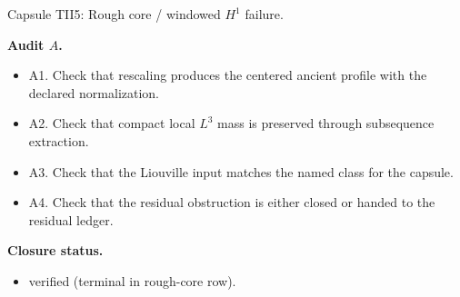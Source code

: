 \documentclass[11pt]{amsart}
\newcommand{\capsulefield}[1]{\par\smallskip\noindent\textbf{#1.}\ }
\begin{document}
\begin{proofcapsule}{Capsule TII5: Rough core / windowed $H^1$ failure.}
  \capsulefield{Audit \(A\)}
  \begin{itemize}[leftmargin=1.8em]
  \item A1. Check that rescaling produces the centered ancient profile with the declared normalization.
  \item A2. Check that compact local $L^3$ mass is preserved through subsequence extraction.
  \item A3. Check that the Liouville input matches the named class for the capsule.
  \item A4. Check that the residual obstruction is either closed or handed to the residual ledger.
  \end{itemize}
  \capsulefield{Closure status}
  \begin{itemize}[leftmargin=1.8em]
  \item verified (terminal in rough-core row).
  \end{itemize}
\end{proofcapsule}
\end{document}
